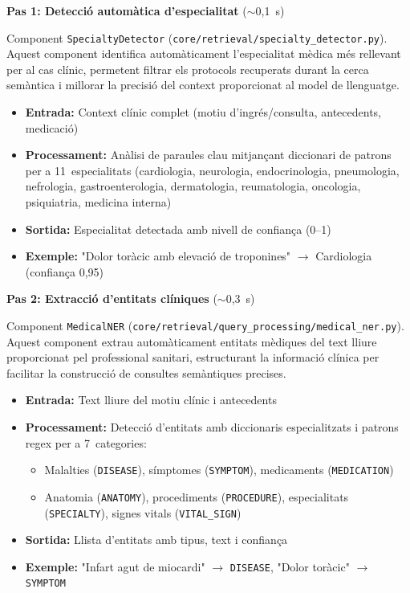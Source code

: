 \documentclass[CAT]{TFUOC}%
\begin{document}
\textbf{Pas 1: Detecció automàtica d'especialitat} ($\sim$0,1~s)

Component \texttt{SpecialtyDetector} (\texttt{core/retrieval/specialty\_detector.py}). Aquest component identifica automàticament l'especialitat mèdica més rellevant per al cas clínic, permetent filtrar els protocols recuperats durant la cerca semàntica i millorar la precisió del context proporcionat al model de llenguatge.

\begin{itemize}
    \setlength{\itemsep}{0.3em}
    \item \textbf{Entrada:} Context clínic complet (motiu d'ingrés/consulta, antecedents, medicació)
    \item \textbf{Processament:} Anàlisi de paraules clau mitjançant diccionari de patrons per a 11~especialitats (cardiologia, neurologia, endocrinologia, pneumologia, nefrologia, gastroenterologia, dermatologia, reumatologia, oncologia, psiquiatria, medicina interna)
    \item \textbf{Sortida:} Especialitat detectada amb nivell de confiança (0--1)
    \item \textbf{Exemple:} "Dolor toràcic amb elevació de troponines" $\rightarrow$ Cardiologia (confiança 0,95)
\end{itemize}

\vspace{0.4em}

\textbf{Pas 2: Extracció d'entitats clíniques} ($\sim$0,3~s)

Component \texttt{MedicalNER} (\texttt{core/retrieval/query\_processing/medical\_ner.py}). Aquest component extrau automàticament entitats mèdiques del text lliure proporcionat pel professional sanitari, estructurant la informació clínica per facilitar la construcció de consultes semàntiques precises.

\begin{itemize}
    \setlength{\itemsep}{0.3em}
    \item \textbf{Entrada:} Text lliure del motiu clínic i antecedents
    \item \textbf{Processament:} Detecció d'entitats amb diccionaris especialitzats i patrons regex per a 7~categories:
    \begin{itemize}
        \item Malalties (\texttt{DISEASE}), símptomes (\texttt{SYMPTOM}), medicaments (\texttt{MEDICATION})
        \item Anatomia (\texttt{ANATOMY}), procediments (\texttt{PROCEDURE}), especialitats (\texttt{SPECIALTY}), signes vitals (\texttt{VITAL\_SIGN})
    \end{itemize}
    \item \textbf{Sortida:} Llista d'entitats amb tipus, text i confiança
    \item \textbf{Exemple:} "Infart agut de miocardi" $\rightarrow$ \texttt{DISEASE}, "Dolor toràcic" $\rightarrow$ \texttt{SYMPTOM}
\end{itemize}
\end{document}
